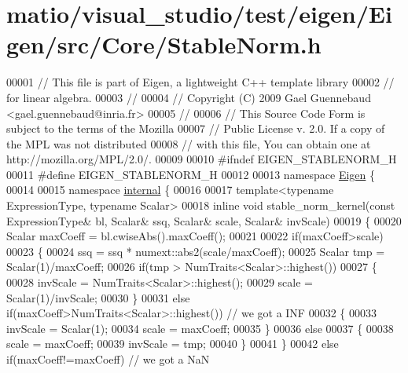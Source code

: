 \hypertarget{matio_2visual__studio_2test_2eigen_2_eigen_2src_2_core_2_stable_norm_8h_source}{}\section{matio/visual\+\_\+studio/test/eigen/\+Eigen/src/\+Core/\+Stable\+Norm.h}
\label{matio_2visual__studio_2test_2eigen_2_eigen_2src_2_core_2_stable_norm_8h_source}

\begin{DoxyCode}
00001 \textcolor{comment}{// This file is part of Eigen, a lightweight C++ template library}
00002 \textcolor{comment}{// for linear algebra.}
00003 \textcolor{comment}{//}
00004 \textcolor{comment}{// Copyright (C) 2009 Gael Guennebaud <gael.guennebaud@inria.fr>}
00005 \textcolor{comment}{//}
00006 \textcolor{comment}{// This Source Code Form is subject to the terms of the Mozilla}
00007 \textcolor{comment}{// Public License v. 2.0. If a copy of the MPL was not distributed}
00008 \textcolor{comment}{// with this file, You can obtain one at http://mozilla.org/MPL/2.0/.}
00009 
00010 \textcolor{preprocessor}{#ifndef EIGEN\_STABLENORM\_H}
00011 \textcolor{preprocessor}{#define EIGEN\_STABLENORM\_H}
00012 
00013 \textcolor{keyword}{namespace }\hyperlink{namespace_eigen}{Eigen} \{ 
00014 
00015 \textcolor{keyword}{namespace }\hyperlink{namespaceinternal}{internal} \{
00016 
00017 \textcolor{keyword}{template}<\textcolor{keyword}{typename} ExpressionType, \textcolor{keyword}{typename} Scalar>
00018 \textcolor{keyword}{inline} \textcolor{keywordtype}{void} stable\_norm\_kernel(\textcolor{keyword}{const} ExpressionType& bl, Scalar& ssq, Scalar& scale, Scalar& invScale)
00019 \{
00020   Scalar maxCoeff = bl.cwiseAbs().maxCoeff();
00021   
00022   \textcolor{keywordflow}{if}(maxCoeff>scale)
00023   \{
00024     ssq = ssq * numext::abs2(scale/maxCoeff);
00025     Scalar tmp = Scalar(1)/maxCoeff;
00026     \textcolor{keywordflow}{if}(tmp > NumTraits<Scalar>::highest())
00027     \{
00028       invScale = NumTraits<Scalar>::highest();
00029       scale = Scalar(1)/invScale;
00030     \}
00031     \textcolor{keywordflow}{else} \textcolor{keywordflow}{if}(maxCoeff>NumTraits<Scalar>::highest()) \textcolor{comment}{// we got a INF}
00032     \{
00033       invScale = Scalar(1);
00034       scale = maxCoeff;
00035     \}
00036     \textcolor{keywordflow}{else}
00037     \{
00038       scale = maxCoeff;
00039       invScale = tmp;
00040     \}
00041   \}
00042   \textcolor{keywordflow}{else} \textcolor{keywordflow}{if}(maxCoeff!=maxCoeff) \textcolor{comment}{// we got a NaN}

\end{DoxyCode}

